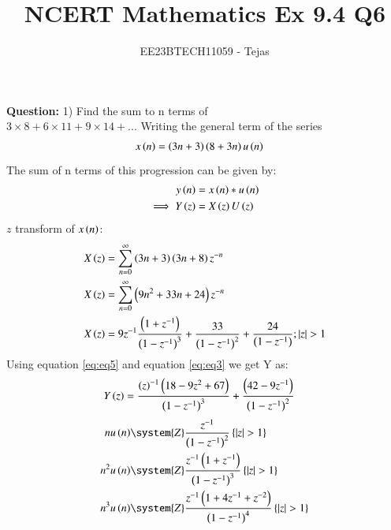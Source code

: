 \documentclass[journal,12pt,twocolumn]{IEEEtran}
\theoremstyle{remark}
\begin{document}

\vspace{3cm}

\title{NCERT Mathematics Ex 9.4 Q6}
\author{EE23BTECH11059 - Tejas$^{}$%
}
\maketitle
\newpage
\textbf{Question:}
1) Find the sum to n terms of\\$3 \times 8 + 6 \times 11 + 9 \times 14 + ...$
    \solution
        Writing the general term of the series
        \begin{align}
            x\left(n\right)&=\left(3n+3\right)\left(8+3n\right)u\left(n\right)
        \end{align}
        The sum of n terms of this progression can be given by:
        \begin{align}
            y\left(n\right) &= x\left(n\right)*u\left(n\right)\\
            \implies  Y\left(z\right) &= X\left(z\right)U\left(z\right) \label{eq:eq3}
        \end{align}
        $z$ transform of $x\left(n\right)$:
        \begin{align}
            X\left(z\right) &= \sum_{n=0}^{\infty} \left(3n+3\right)\left(3n+8\right)z^{-n} \\
            X\left(z\right) &= \sum_{n=0}^{\infty} \left(9n^2 +33n+24\right)z^{-n} \\
            X\left(z\right)&=9z^{-1}\frac{\left(1+z^{-1}\right)}{\left(1-z^{-1}\right)^3} + \frac{33}{\left(1-z^{-1}\right)^2} +\frac{24}{\left(1-z^{-1}\right)}; \left\vert z\right\vert>1    \label{eq:eq5}
        \end{align}
        Using equation \eqref{eq:eq5} and equation \eqref{eq:eq3} we get Y as:
        \begin{align}
            Y\left(z\right)&= \frac{\left(z\right)^{-1}\left(18-9z^2+67\right)}{\left(1-z^{-1}\right)^3} + \frac{\left(42-9z^{-1}\right)}{\left(1-z^{-1}\right)^2} 
        \end{align}
        \begin{align}
            nu\brak{n} &\system{Z} \frac{z^{-1}}{\brak{1-z^{-1}}^2} \cbrak{\abs{z}>1} \label{eq:z transform of nu{n}} \\
            n^2 u\brak{n} &\system{Z} \frac{z^{-1}\brak{1+z^{-1}}}{\brak{1-z^{-1}}^3} \cbrak{\abs{z}>1}\label{eq:z transform of n^2u{n}} \\
            n^3 u\brak{n} &\system{Z} \frac{z^{-1}\brak{1+4z^{-1}+z^{-2}}}{\brak{1-z^{-1}}^4} \cbrak{\abs{z}>1}\label{eq:z transform of n^3u{n}} 
        \end{align}
\end{document}
